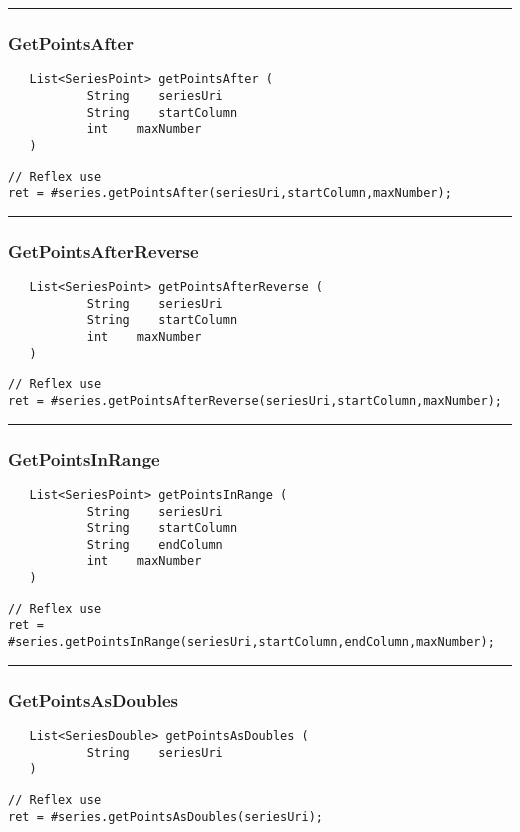 \rule{15cm}{2pt}
\subsubsection{GetPointsAfter}
\label{Api:GetPointsAfter}
\begin{verbatim}
   List<SeriesPoint> getPointsAfter (
           String    seriesUri
           String    startColumn
           int    maxNumber
   )
\end{verbatim}
\begin{lstlisting}[language=reflex]
// Reflex use
ret = #series.getPointsAfter(seriesUri,startColumn,maxNumber);
\end{lstlisting}



\rule{15cm}{2pt}
\subsubsection{GetPointsAfterReverse}
\label{Api:GetPointsAfterReverse}
\begin{verbatim}
   List<SeriesPoint> getPointsAfterReverse (
           String    seriesUri
           String    startColumn
           int    maxNumber
   )
\end{verbatim}
\begin{lstlisting}[language=reflex]
// Reflex use
ret = #series.getPointsAfterReverse(seriesUri,startColumn,maxNumber);
\end{lstlisting}



\rule{15cm}{2pt}
\subsubsection{GetPointsInRange}
\label{Api:GetPointsInRange}
\begin{verbatim}
   List<SeriesPoint> getPointsInRange (
           String    seriesUri
           String    startColumn
           String    endColumn
           int    maxNumber
   )
\end{verbatim}
\begin{lstlisting}[language=reflex]
// Reflex use
ret = #series.getPointsInRange(seriesUri,startColumn,endColumn,maxNumber);
\end{lstlisting}



\rule{15cm}{2pt}
\subsubsection{GetPointsAsDoubles}
\label{Api:GetPointsAsDoubles}
\begin{verbatim}
   List<SeriesDouble> getPointsAsDoubles (
           String    seriesUri
   )
\end{verbatim}
\begin{lstlisting}[language=reflex]
// Reflex use
ret = #series.getPointsAsDoubles(seriesUri);
\end{lstlisting}



